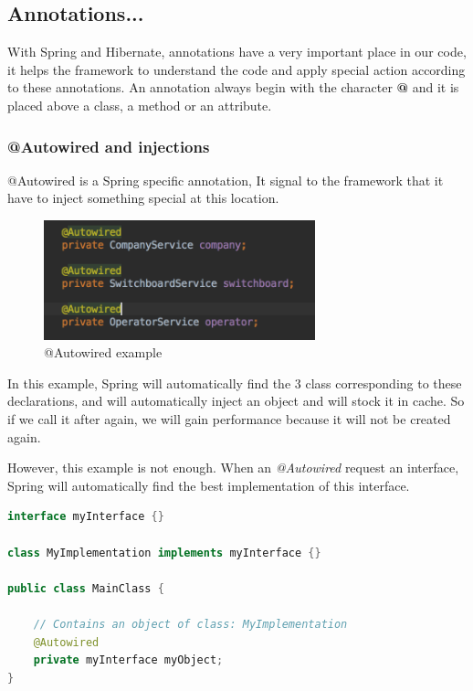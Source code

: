 \subsection{Annotations...}

With Spring and Hibernate, annotations have a very important place in our code, it helps the framework to understand the code and apply special action according to these annotations.
An annotation always begin with the character \textbf{@} and it is placed above a class, a method or an attribute.

\subsubsection{@Autowired and injections}
@Autowired is a Spring specific annotation, It signal to the framework that it have to inject something special at this location.

\begin{figure}[H]
  \caption{@Autowired example}
  \centering
    \includegraphics[width=0.7\textwidth]{img/autowired.png}
\end{figure}

In this example, Spring will automatically find the 3 class corresponding to these declarations, and will automatically inject an object and will stock it in cache. So if we call it after again, we will gain performance because it will not be created again.\newline

However, this example is not enough. When an \textit{@Autowired} request an interface, Spring will automatically find the best implementation of this interface.
 
\begin{lstlisting}[language=java,caption={JAVA}]
interface myInterface {}

class MyImplementation implements myInterface {}

public class MainClass {

	// Contains an object of class: MyImplementation
	@Autowired
	private myInterface myObject; 
}
\end{lstlisting}




